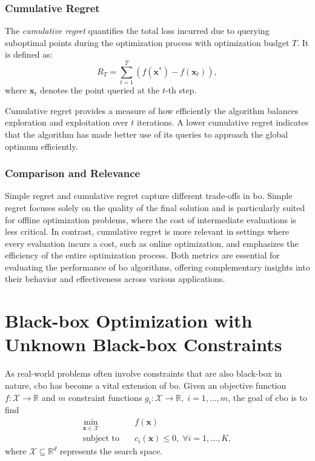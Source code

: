 \subsubsection{Cumulative Regret}

The \emph{cumulative regret} quantifies the total loss incurred due to querying suboptimal points during the optimization process with optimization budget $T$. It is defined as:
\[
R_T = \sum_{t=1}^T \left( f(\mathbf{x}^*) - f(\mathbf{x}_t) \right),
\]
where \( \mathbf{x}_t \) denotes the point queried at the \( t \)-th step. 

Cumulative regret provides a measure of how efficiently the algorithm balances exploration and exploitation over \( t \) iterations. A lower cumulative regret indicates that the algorithm has made better use of its queries to approach the global optimum efficiently.

\subsubsection{Comparison and Relevance}

Simple regret and cumulative regret capture different trade-offs in \ac{bo}. Simple regret focuses solely on the quality of the final solution and is particularly suited for offline optimization problems, where the cost of intermediate evaluations is less critical. In contrast, cumulative regret is more relevant in settings where every evaluation incurs a cost, such as online optimization, and emphasizes the efficiency of the entire optimization process. Both metrics are essential for evaluating the performance of \ac{bo} algorithms, offering complementary insights into their behavior and effectiveness across various applications.

\section{Black-box Optimization with Unknown Black-box Constraints}
\label{section:bo_unknown_constraints}
As real-world problems often involve constraints that are also black-box in nature, \ac{cbo} has become a vital extension of \acl{bo}. Given an objective function $f: \mathcal{X} \to \mathbb{R}$ and $m$ constraint functions $g_i: \mathcal{X} \to \mathbb{R}, \; i = 1, \dots, m$, the goal of \ac{cbo} is to find
\begin{equation}
\label{eq:cbo_problem}
\begin{aligned}
    \min_{\mathbf{x} \in \mathcal{X}} \quad & f(\mathbf{x}) \\
    \text{subject to} \quad & c_i(\mathbf{x}) \leq 0, \; \forall i = 1, \dots, K,
\end{aligned}
\end{equation}
where $\mathcal{X} \subseteq \mathbb{R}^d$ represents the search space.

